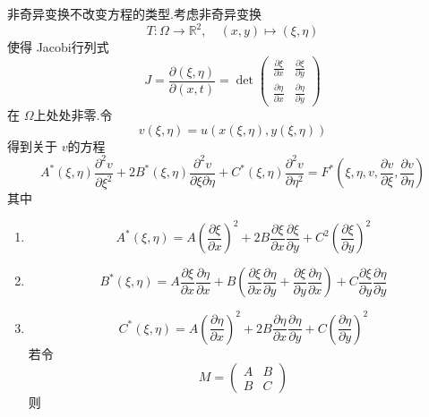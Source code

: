 \documentclass[../../PDE.tex]{subfiles}
\begin{document}
\begin{theorem}
    非奇异变换不改变方程的类型.考虑非奇异变换 \[
    T:  \Omega \to \mathbb{R} ^{2},\quad \left( x,y \right)\mapsto \left(   \xi ,\eta  \right)  
    \]使得 Jacobi行列式 \[
    J= \frac{ \partial \left(  \xi ,\eta  \right)  }{ \partial \left( x,t \right)  }= \det \begin{pmatrix} 
        \frac{\partial  \xi }{\partial x}&\frac{\partial  \xi }{\partial y}\\ 
         \frac{\partial \eta }{\partial x}&\frac{\partial \eta }{\partial y} 
    \end{pmatrix}  
    \]在 \(   \Omega   \)上处处非零.令 \[
    v\left(  \xi ,\eta  \right)= u\left( x\left(  \xi ,\eta  \right)  ,y\left(  \xi ,\eta  \right) \right)  
    \] 得到关于 \(  v  \)的方程 \[
    A^{*}\left(  \xi ,\eta  \right)\frac{\partial ^{2}v}{\partial  \xi ^{2}}+ 2B^{*}\left(  \xi ,\eta  \right)\frac{\partial ^{2}v}{\partial  \xi  \partial \eta }+ C^{*}\left(  \xi ,\eta  \right)\frac{\partial ^{2}v}{\partial \eta ^{2}}= F^{*}\left(  \xi ,\eta ,v ,\frac{\partial v}{\partial  \xi },\frac{\partial v}{\partial \eta }\right)    
    \] 其中 
    \begin{enumerate}
        \item \[
        A^{*}\left(  \xi ,\eta  \right)= A\left( \frac{\partial  \xi }{\partial x} \right)^{2}+ 2B\frac{\partial  \xi }{\partial x}\frac{\partial  \xi }{\partial y}+  C^{2}\left( \frac{\partial  \xi }{\partial y} \right)^{2}  
        \]
        \item \[
        B^{*}\left(  \xi ,\eta  \right)= A\frac{\partial  \xi }{\partial x}\frac{\partial \eta }{\partial x}+ B\left( \frac{\partial  \xi }{\partial x}\frac{\partial \eta }{\partial y}+ \frac{\partial  \xi }{\partial y}\frac{\partial \eta }{\partial x} \right)+ C\frac{\partial  \xi }{\partial y}\frac{\partial \eta }{\partial y}  
        \]
        \item \[
        C^{*}\left(  \xi ,\eta  \right)= A\left( \frac{\partial \eta }{\partial x} \right)^{2}+ 2B \frac{\partial \eta }{\partial x}\frac{\partial \eta }{\partial y}+ C\left( \frac{\partial \eta }{\partial y} \right)^{2}   
        \]若令 \[
        M =  \begin{pmatrix} 
            A&B\\ 
             B&C 
        \end{pmatrix} 
        \]则 
\end{enumerate}
\end{theorem}
\end{document}
